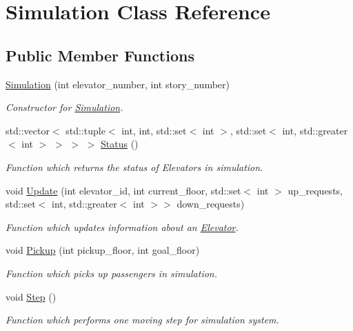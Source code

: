 \hypertarget{class_simulation}{}\section{Simulation Class Reference}
\label{class_simulation}
\subsection*{Public Member Functions}
\begin{DoxyCompactItemize}
\item 
\mbox{\hyperlink{class_simulation_aa4160c22753211031194702166b1a516}{Simulation}} (int elevator\+\_\+number, int story\+\_\+number)
\begin{DoxyCompactList}\small\item\em Constructor for \mbox{\hyperlink{class_simulation}{Simulation}}. \end{DoxyCompactList}\item 
std\+::vector$<$ std\+::tuple$<$ int, int, std\+::set$<$ int $>$, std\+::set$<$ int, std\+::greater$<$ int $>$ $>$ $>$ $>$ \mbox{\hyperlink{class_simulation_ae9f27ebb878f4c590c73b27539b88a42}{Status}} ()
\begin{DoxyCompactList}\small\item\em Function which returns the status of Elevators in simulation. \end{DoxyCompactList}\item 
void \mbox{\hyperlink{class_simulation_a65090d6b0a47565ba57c21f96c48b930}{Update}} (int elevator\+\_\+id, int current\+\_\+floor, std\+::set$<$ int $>$ up\+\_\+requests, std\+::set$<$ int, std\+::greater$<$ int $>$$>$ down\+\_\+requests)
\begin{DoxyCompactList}\small\item\em Function which updates information about an \mbox{\hyperlink{class_elevator}{Elevator}}. \end{DoxyCompactList}\item 
void \mbox{\hyperlink{class_simulation_a2b5b39a02fcde98b0e7b3f10c3f2703a}{Pickup}} (int pickup\+\_\+floor, int goal\+\_\+floor)
\begin{DoxyCompactList}\small\item\em Function which picks up passengers in simulation. \end{DoxyCompactList}\item 
\mbox{\label{class_simulation_ab53def8471d4b5bce6bade102f5a1dec}} 
void \mbox{\hyperlink{class_simulation_ab53def8471d4b5bce6bade102f5a1dec}{Step}} ()
\begin{DoxyCompactList}\small\item\em Function which performs one moving step for simulation system. \end{DoxyCompactList}\end{DoxyCompactItemize}



